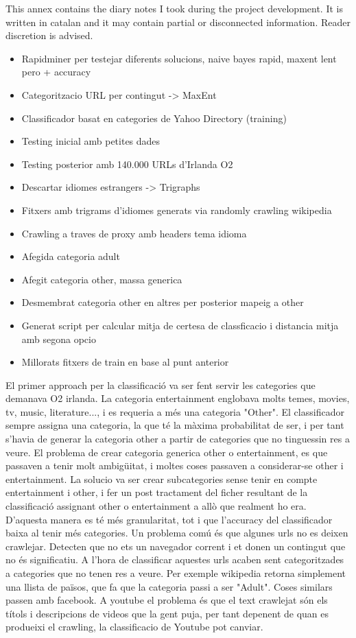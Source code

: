 
This annex contains the diary notes I took during the project development. It is written in catalan and it may contain partial or disconnected information. 
Reader discretion is advised.

\begin{itemize}
  \item Rapidminer per testejar diferents solucions, naive bayes rapid, maxent lent pero + accuracy
  \item Categoritzacio URL per contingut -> MaxEnt
  \item Classificador basat en categories de Yahoo Directory (training)
  \item Testing inicial amb petites dades
  \item Testing posterior amb 140.000 URLs d'Irlanda O2
  \item Descartar idiomes estrangers -> Trigraphs
  \item Fitxers amb trigrams d'idiomes generats via randomly crawling wikipedia
  \item Crawling a traves de proxy amb headers tema idioma
  \item Afegida categoria adult
  \item Afegit categoria other, massa generica
  \item Desmembrat categoria other en altres per posterior mapeig a other
  \item Generat script per calcular mitja de certesa de classficacio i distancia mitja amb segona opcio
  \item Millorats fitxers de train en base al punt anterior
\end{itemize}


El primer approach per la classificació va ser fent servir les categories que demanava O2 irlanda. La categoria entertainment englobava molts temes, movies, tv, music,
literature..., i es requeria a més una categoria "Other". El classificador sempre assigna una categoria, la que té la màxima probabilitat de ser, i per tant s'havia 
de generar la categoria other a partir de categories que no tinguessin res a veure.
El problema de crear categoria generica other o entertainment, es que passaven a tenir molt ambigüitat, i moltes coses passaven a considerar-se other i entertainment.
La solucio va ser crear subcategories sense tenir en compte entertainment i other, i fer un post tractament del ficher resultant de la classificació assignant other o 
entertainment a allò que realment ho era. D'aquesta manera es té més granularitat, tot i que l'accuracy del classificador baixa al tenir més categories.
Un problema comú és que algunes urls no es deixen crawlejar. Detecten que no ets un navegador corrent i et donen un contingut que no és significatiu. A l'hora de
classificar aquestes urls acaben sent categoritzades a categories que no tenen res a veure. Per exemple wikipedia retorna simplement una llista de països, que fa que 
la categoria passi a ser "Adult". Coses similars passen amb facebook. 
A youtube el problema és que el text crawlejat són els títols i descripcions de videos que la gent puja, per tant depenent de quan es produeixi el crawling, la
classificacio de Youtube pot canviar.


